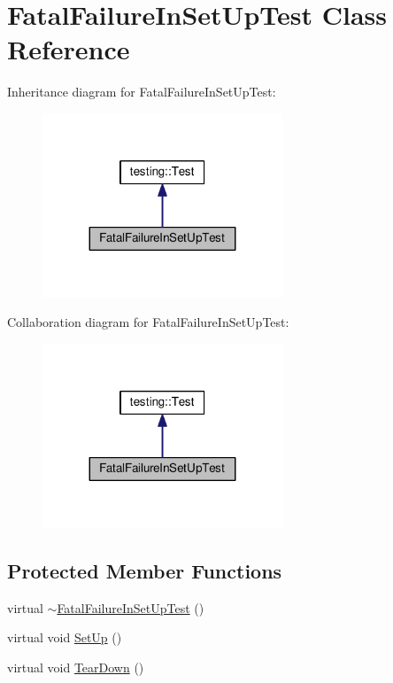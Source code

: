 \hypertarget{classFatalFailureInSetUpTest}{}\section{Fatal\+Failure\+In\+Set\+Up\+Test Class Reference}
\label{classFatalFailureInSetUpTest}


Inheritance diagram for Fatal\+Failure\+In\+Set\+Up\+Test\+:\nopagebreak
\begin{figure}[H]
\begin{center}
\leavevmode
\includegraphics[width=203pt]{classFatalFailureInSetUpTest__inherit__graph}
\end{center}
\end{figure}


Collaboration diagram for Fatal\+Failure\+In\+Set\+Up\+Test\+:\nopagebreak
\begin{figure}[H]
\begin{center}
\leavevmode
\includegraphics[width=203pt]{classFatalFailureInSetUpTest__coll__graph}
\end{center}
\end{figure}
\subsection*{Protected Member Functions}
\begin{DoxyCompactItemize}
\item 
virtual \hyperlink{classFatalFailureInSetUpTest_a915ca362b046259c3586c1ab72bb0a93}{$\sim$\+Fatal\+Failure\+In\+Set\+Up\+Test} ()
\item 
virtual void \hyperlink{classFatalFailureInSetUpTest_a455696f86fb5f5393624221ccb79b373}{Set\+Up} ()
\item 
virtual void \hyperlink{classFatalFailureInSetUpTest_a457707161063e08f7b6600ec5db449e4}{Tear\+Down} ()
\end{DoxyCompactItemize}
